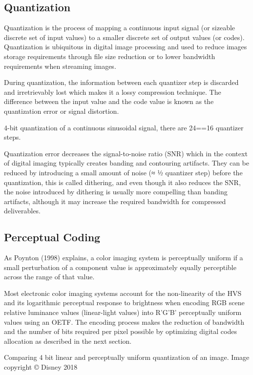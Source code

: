 \subsection{Quantization}

Quantization is the process of mapping a continuous input signal (or sizeable discrete set of input values) to a smaller discrete set of output values (or codes). Quantization is ubiquitous in digital image processing and used to reduce images storage requirements through file size reduction or to lower bandwidth requirements when streaming images.

During quantization, the information between each quantizer step is discarded and irretrievably lost which makes it a lossy compression technique. The difference between the input value and the code value is known as the quantization error or signal distortion.

4-bit quantization of a continuous sinusoidal signal, there are 24==16 quantizer steps.


Quantization error decreases the signal-to-noise ratio (SNR) which in the context of digital imaging typically creates banding and contouring artifacts. They can be reduced by introducing a small amount of noise (≈ ½ quantizer step) before the quantization, this is called dithering, and even though it also reduces the SNR, the noise introduced by dithering is usually more compelling than banding artifacts, although it may increase the required bandwidth for compressed deliverables.

\subsection{Perceptual Coding}

As Poynton (1998) explains, a color imaging system is perceptually uniform if a small perturbation of a component value is approximately equally perceptible across the range of that value.

Most electronic color imaging systems account for the non-linearity of the HVS and its logarithmic perceptual response to brightness when encoding RGB scene relative luminance values (linear-light values) into R’G’B’ perceptually uniform values using an OETF. The encoding process makes the reduction of bandwidth and the number of bits required per pixel possible by optimizing digital codes allocation as described in the next section.

Comparing 4 bit linear and perceptually uniform quantization of an image.
Image copyright © Disney 2018

